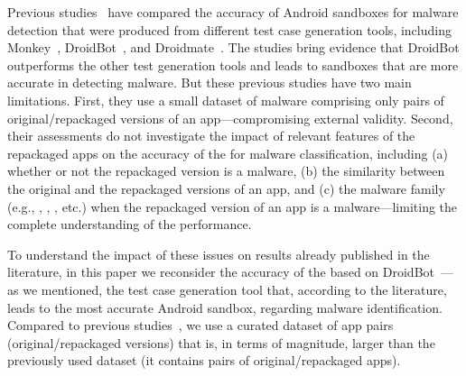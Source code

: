 Previous studies~\cite{DBLP:conf/wcre/BaoLL18,DBLP:journals/jss/CostaMMSSBNR22} 
have compared the accuracy of  Android sandboxes for malware detection 
that were produced 
from 
different test case generation tools, including Monkey~\cite{Monkey}, DroidBot~\cite{DBLP:conf/icse/LiYGC17}, and Droidmate~\cite{DBLP:conf/kbse/BorgesHZ18}.
The studies bring evidence that 
DroidBot outperforms the other test generation tools and leads to sandboxes that are more accurate in detecting malware.
But these previous studies have two main limitations.
First, they use a small dataset of malware comprising only \appsSmall pairs of original/repackaged versions of an app---compromising external validity. Second, their assessments do not investigate
the impact of relevant features of the repackaged apps on the accuracy of the \mas for malware classification, including
(a) whether or not the repackaged version is a malware, (b) the similarity between the original and the repackaged versions of an app,
and (c) the malware family (e.g., , , , etc.) when the repackaged
version of an app is a malware---limiting the complete understanding of the \mas performance. 



To understand the impact of these issues on results already published in the literature, in this paper we reconsider the accuracy of the \mas based on
DroidBot~\cite{DBLP:conf/icse/LiYGC17}---as we mentioned, the test case generation tool that, according to the literature, leads to the most accurate Android sandbox, regarding malware identification. 
Compared to previous studies~\cite{DBLP:conf/wcre/BaoLL18,DBLP:conf/scam/CostaMCMVBC20},
we use a curated dataset of app pairs (original/repackaged versions) that is, in terms of magnitude, larger than the previously used
dataset (it contains \apps pairs of original/repackaged apps).
 
